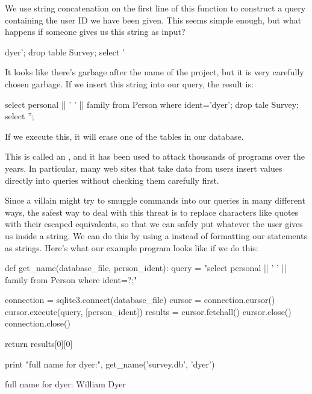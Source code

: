 We use string concatenation on the first line of this function to
construct a query containing the user ID we have been given. This seems
simple enough, but what happens if someone gives us this string as
input?

\begin{VerbOut}
dyer'; drop table Survey; select '
\end{VerbOut}

It looks like there's garbage after the name of the project, but it is
very carefully chosen garbage. If we insert this string into our query,
the result is:

\begin{VerbIn}
select personal || ' ' || family from Person where ident='dyer'; drop tale Survey; select '';
\end{VerbIn}

If we execute this, it will erase one of the tables in our database.

This is called an , and it has been used to attack thousands of programs over the
years. In particular, many web sites that take data from users insert
values directly into queries without checking them carefully first.

Since a villain might try to smuggle commands into our queries in many
different ways, the safest way to deal with this threat is to replace
characters like quotes with their escaped equivalents, so that we can
safely put whatever the user gives us inside a string. We can do this by
using a  instead of
formatting our statements as strings. Here's what our example program
looks like if we do this:

\begin{VerbIn}
def get_name(database_file, person_ident):
    query = "select personal || ' ' || family from Person where ident=?;"

    connection = sqlite3.connect(database_file)
    cursor = connection.cursor()
    cursor.execute(query, [person_ident])
    results = cursor.fetchall()
    cursor.close()
    connection.close()

    return results[0][0]

print "full name for dyer:", get_name('survey.db', 'dyer')
\end{VerbIn}

\begin{VerbOut}
full name for dyer: William Dyer
\end{VerbOut}

